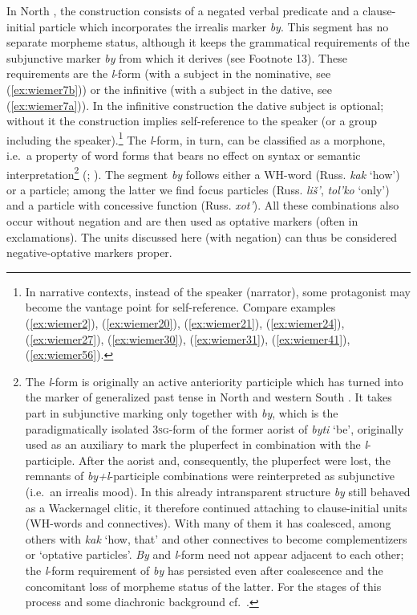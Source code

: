 \documentclass[output=paper,colorlinks,citecolor=brown]{langscibook}
\begin{document}
In North , the construction consists of a negated verbal predicate and a clause-initial particle which incorporates the irrealis marker \textit{by}. This segment has no separate morpheme status, although it keeps the grammatical requirements of the subjunctive marker \textit{by} from which it derives (see Footnote 13). These requirements are the \textit{l}-form (with a subject in the nominative, see (\ref{ex:wiemer7b})) or the infinitive (with a subject in the dative, see (\ref{ex:wiemer7a})). In the infinitive construction the dative subject is optional; without it the construction implies self-reference to the speaker (or a group including the speaker).\footnote{In narrative contexts, instead of the speaker (narrator), some protagonist may become the vantage point for self-reference. Compare examples (\ref{ex:wiemer2}), (\ref{ex:wiemer20}), (\ref{ex:wiemer21}), (\ref{ex:wiemer24}), (\ref{ex:wiemer27}), (\ref{ex:wiemer30}), (\ref{ex:wiemer31}), (\ref{ex:wiemer41}), (\ref{ex:wiemer56}).} The \textit{l}-form, in turn, can be classified as a morphone, i.e.\ a property of word forms that bears no effect on syntax or semantic interpretation\footnote{The \textit{l}-form is originally an active anteriority participle which has turned into the marker of generalized past tense in North  and western South . It takes part in subjunctive marking only together with \textit{by}, which is the paradigmatically isolated \textsc{3sg}-form of the former aorist of \textit{byti} `be', originally used as an auxiliary to mark the pluperfect in combination with the \textit{l}-participle. After the aorist and, consequently, the pluperfect were lost, the remnants of \textit{by+l}-participle combinations were reinterpreted as subjunctive (i.e.\ an irrealis mood). In this already intransparent structure \textit{by} still behaved as a Wackernagel clitic, it therefore continued attaching to clause-initial units (WH-words and connectives). With many of them it has coalesced, among others with  \textit{kak} `how, that' and other connectives to become complementizers or `optative particles'. \textit{By} and \textit{l}-form need not appear adjacent to each other; the \textit{l}-form requirement of \textit{by} has persisted even after coalescence and the concomitant loss of morpheme status of the latter. For the stages of this process and some diachronic background \mbox{cf.\ \citet{Wiemer2015}}.} \textrm{(\citealt{Aronoff1994}; \citealt{Stump2016}). The segment} \textrm{\textit{by}} \textrm{follows either a WH-word (Russ.} \textrm{\textit{kak}} \textrm{`how') or a particle; among the latter we find focus particles (Russ.} \textrm{\textit{liš'}}, \textrm{\textit{tol'ko}} \textrm{`only') and a particle with concessive function (Russ.} \textrm{\textit{xot'}}). All these combinations also occur without negation and are then used as optative markers (often in exclamations). The units discussed here (with negation) can thus be considered negative-optative markers proper.
\end{document}
